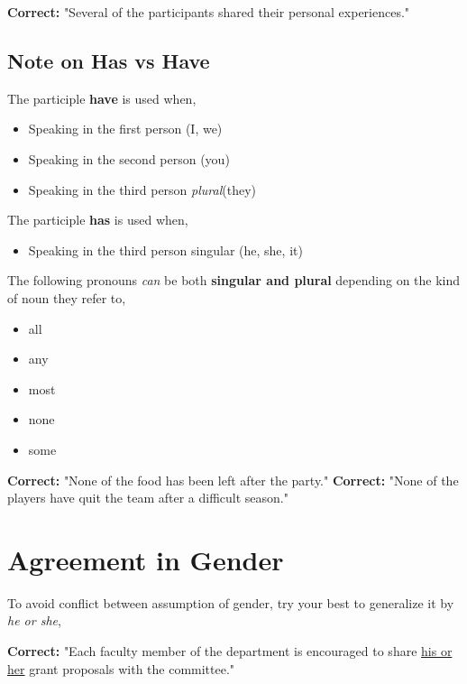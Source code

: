 \documentclass[12pt]{article} %
\begin{document}
\textbf{Correct:} "Several of the participants shared their personal experiences."

\newpage

\subsection{Note on Has vs Have}
The participle \textbf{have} is used when,
\begin{itemize}
  \item Speaking in the first person (I, we)
  \item Speaking in the second person (you)
  \item Speaking in the third person \textit{plural}(they)
\end{itemize}

The participle \textbf{has} is used when,

\begin{itemize}
  \item Speaking in the third person singular (he, she, it)
\end{itemize}

\vspace*{1cm}

The following pronouns \textit{can} be both \textbf{singular and plural} depending on the kind of noun they refer to,
\begin{multicols}{5}
  \begin{itemize}
    \item all
      \columnbreak
    \item any
      \columnbreak
    \item most
      \columnbreak
    \item none
      \columnbreak
    \item some
  \end{itemize}
\end{multicols}


\textbf{Correct: }"None of the food has been left after the party."
\textbf{Correct: }"None of the players have quit the team after a difficult season."


\section{Agreement in Gender}
To avoid conflict between assumption of gender, try your best to generalize it by \textit{he or she},

\textbf{Correct: }"Each faculty member of the department is encouraged to share \underline{his or her} grant proposals with the committee."
\end{document}
